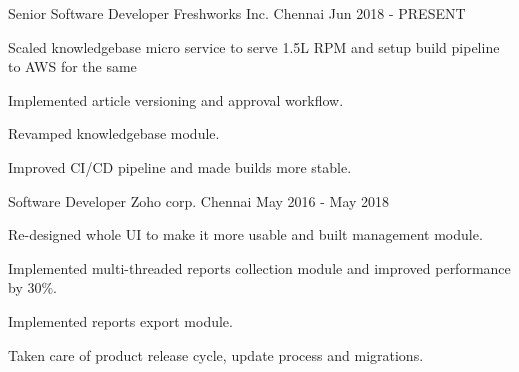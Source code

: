 
\begin{cventries}
  \cventry
    {Senior Software Developer} %
    {Freshworks Inc.} %
    {Chennai} %
    {Jun 2018 - PRESENT} %
    {
      \begin{cvitems} %
        \item {Scaled knowledgebase micro service to serve 1.5L RPM and setup build pipeline to AWS for the same}
        \item {Implemented article versioning and approval workflow.}
        \item {Revamped knowledgebase module.}
        \item {Improved CI/CD pipeline and made builds more stable.}
      \end{cvitems}
    }

  \cventry
    {Software Developer} %
    {Zoho corp.} %
    {Chennai} %
    {May 2016 - May 2018} %
    {
      \begin{cvitems} %
        \item {Re-designed whole UI to make it more usable and built management module.}
        \item {Implemented multi-threaded reports collection module and improved performance by 30\%.}
        \item {Implemented reports export module.}
        \item {Taken care of product release cycle, update process and migrations.}
      \end{cvitems}
    }    
\end{cventries}
